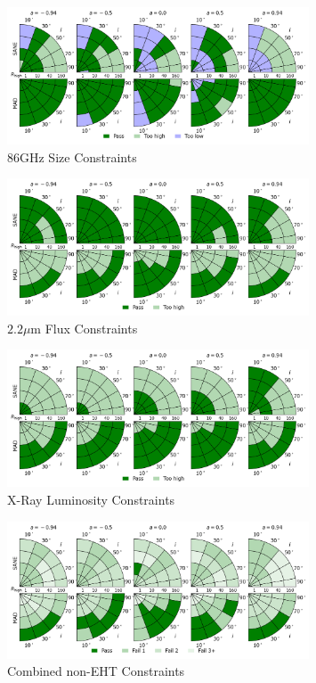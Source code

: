 \begin{figure}
  \centering
  \includegraphics[width=0.8\textwidth]{./figures/86GHz_size_Constraints.png}
  \caption{86GHz Size Constraints}
  \label{fig:86GHz_size_pizza}
\end{figure}
\begin{figure}
  \centering
  \includegraphics[width=0.8\textwidth]{./figures/2um_flux_Constraints.png}
  \caption{$2.2\mu$m Flux Constraints}
  \label{fig:2um_flux_pizza}
\end{figure}
\begin{figure}
  \centering
  \includegraphics[width=0.8\textwidth]{./figures/Xray_flux_Constraints.png}
  \caption{X-Ray Luminosity Constraints}
  \label{fig:xray_pizza}
\end{figure}
\begin{figure}
  \centering
  \includegraphics[width=0.8\textwidth]{./figures/Non_Interferometric_Constraints.png}
  \caption{Combined non-EHT Constraints}
  \label{fig:noneht_pizza}
\end{figure}

